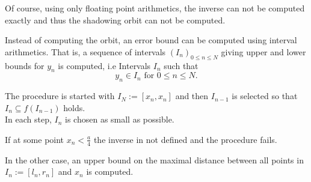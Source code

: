     Of course, using only floating point arithmetics, the inverse can not be
    computed exactly and thus the shadowing orbit can not be computed.

    Instead of computing the orbit, an error bound can be computed using
    interval arithmetics. 
    That is, a sequence of intervals $(I_n)_{0 \leq n \leq N}$ giving upper and
    lower bounds for $y_n$ is computed, i.e Intervals $I_n$ such that
    $$y_n \in I_n \text{ for } 0 \leq n \leq N.$$

    The procedure is started with $I_N := [x_n, x_n]$ and then $I_{n-1}$ is
    selected so that $I_n \subseteq f(I_{n-1})$ holds.\\
    In each step, $I_n$ is chosen as small as possible. 

    If at some point $x_n < \frac{a}{4}$ the inverse in not defined and the
    procedure fails.
    
    In the other case, an upper bound on the maximal distance between all points in
    $I_n := [l_n, r_n]$ and $x_n$ is computed.

